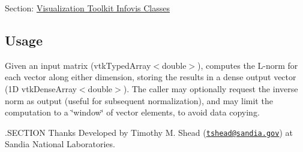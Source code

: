 Section\-: \hyperlink{sec_vtkinfovis}{Visualization Toolkit Infovis Classes} \hypertarget{vtkwidgets_vtkxyplotwidget_Usage}{}\subsection{Usage}\label{vtkwidgets_vtkxyplotwidget_Usage}
Given an input matrix (vtk\-Typed\-Array$<$double$>$), computes the L-\/norm for each vector along either dimension, storing the results in a dense output vector (1\-D vtk\-Dense\-Array$<$double$>$). The caller may optionally request the inverse norm as output (useful for subsequent normalization), and may limit the computation to a \char`\"{}window\char`\"{} of vector elements, to avoid data copying.

.S\-E\-C\-T\-I\-O\-N Thanks Developed by Timothy M. Shead (\href{mailto:tshead@sandia.gov}{\tt tshead@sandia.\-gov}) at Sandia National Laboratories.

